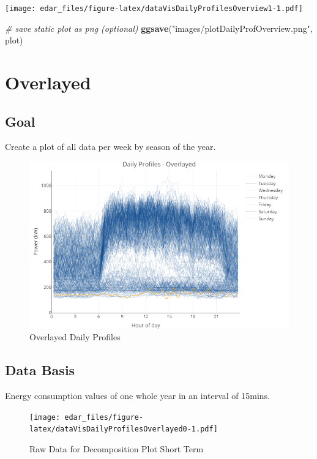 \documentclass[
]{book}
\newenvironment{Shaded}{\begin{snugshade}}{\end{snugshade}}
\newcommand{\CommentTok}[1]{\textcolor[rgb]{0.56,0.35,0.01}{\textit{#1}}}
\newcommand{\KeywordTok}[1]{\textcolor[rgb]{0.13,0.29,0.53}{\textbf{#1}}}
\newcommand{\NormalTok}[1]{#1}
\newcommand{\StringTok}[1]{\textcolor[rgb]{0.31,0.60,0.02}{#1}}
\let\oldShaded\Shaded
\let\endoldShaded\endShaded
\renewenvironment{Shaded}{\footnotesize\oldShaded}{\endoldShaded}
\begin{document}
\texttt{[image: edar\_files/figure-latex/dataVisDailyProfilesOverview1-1.pdf]}

\begin{Shaded}
\begin{Highlighting}[]
\CommentTok{# save static plot as png (optional)}
\KeywordTok{ggsave}\NormalTok{(}\StringTok{"images/plotDailyProfOverview.png"}\NormalTok{, plot)}
\end{Highlighting}
\end{Shaded}

\hypertarget{overlayed}{%
\section{Overlayed}\label{overlayed}}

\hypertarget{goal-9}{%
\subsection{Goal}\label{goal-9}}

Create a plot of all data per week by season of the year.

\begin{figure}
\includegraphics[width=0.7\linewidth]{images/plotDailyProfOverlayed} \caption{Overlayed Daily Profiles}\label{fig:unnamed-chunk-18}
\end{figure}

\hypertarget{data-basis-9}{%
\subsection{Data Basis}\label{data-basis-9}}

Energy consumption values of one whole year in an interval of 15mins.

\begin{figure}
\centering
\texttt{[image: edar\_files/figure-latex/dataVisDailyProfilesOverlayed0-1.pdf]}
\caption{\label{fig:dataVisDailyProfilesOverlayed0}Raw Data for Decomposition Plot Short Term}
\end{figure}
\end{document}
